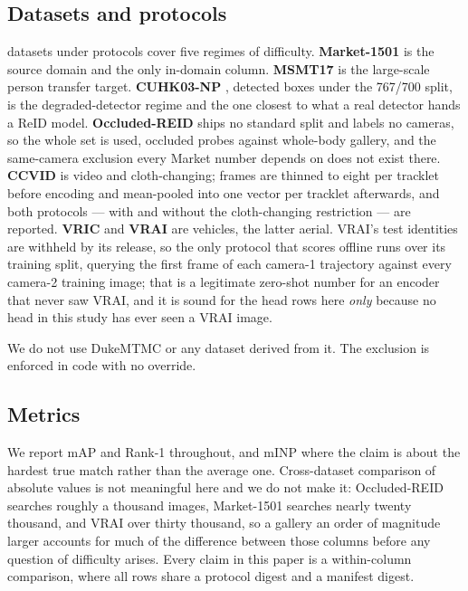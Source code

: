 \subsection{Datasets and protocols}
\nDatasets{} datasets under \nProtocols{} protocols cover five regimes of difficulty.
\textbf{Market-1501} \cite{zheng2015scalable} is the source domain and the only in-domain
column. \textbf{MSMT17} \cite{wei2018msmt} is the large-scale person transfer target.
\textbf{CUHK03-NP} \cite{zhong2017reranking}, detected boxes under the 767/700 split, is the
degraded-detector regime and the one closest to what a real detector hands a ReID model.
\textbf{Occluded-REID} \cite{zhuo2018occluded} ships no standard split and labels no cameras,
so the whole set is used, occluded probes against whole-body gallery, and the same-camera
exclusion every Market number depends on does not exist there. \textbf{CCVID}
\cite{gu2022ccvid} is video and cloth-changing; frames are thinned to eight per tracklet before
encoding and mean-pooled into one vector per tracklet afterwards, and both protocols --- with
and without the cloth-changing restriction --- are reported. \textbf{VRIC} \cite{kanaci2018vric}
and \textbf{VRAI} \cite{wang2019vrai} are vehicles, the latter aerial. VRAI's test identities
are withheld by its release, so the only protocol that scores offline runs over its training
split, querying the first frame of each camera-1 trajectory against every camera-2 training
image; that is a legitimate zero-shot number for an encoder that never saw VRAI, and it is
sound for the head rows here \emph{only} because no head in this study has ever seen a VRAI
image.

We do not use DukeMTMC or any dataset derived from it. The exclusion is enforced in code with
no override.

\begin{table}[t]
\centering
\caption{Coverage: run records per (encoder, dataset) pair, four per cell being the four heads
and eight where the dataset ships two protocols. The MSMT17 column is the study's one
systematic gap and is discussed in \cref{sec:limitations}.}
\label{tab:coverage}
\scriptsize
\setlength{\tabcolsep}{3pt}

\end{table}

\subsection{Metrics}
We report mAP and Rank-1 throughout, and mINP \cite{ye2022deep} where the claim is about the
hardest true match rather than the average one. Cross-dataset comparison of absolute values is
not meaningful here and we do not make it: Occluded-REID searches roughly a thousand images,
Market-1501 searches nearly twenty thousand, and VRAI over thirty thousand, so a gallery an
order of magnitude larger accounts for much of the difference between those columns before any
question of difficulty arises. Every claim in this paper is a within-column comparison, where
all rows share a protocol digest and a manifest digest.

